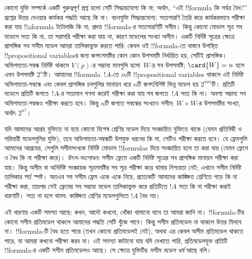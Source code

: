 \documentclass[../../../include/open-logic-section]{subfiles}
\begin{document}


কোনো যুক্তি সম্পর্কে একটি গুরুত্বপূর্ণ প্রশ্ন হলো সেটি সিদ্ধান্তযোগ্য কি না; অর্থাৎ, “এই !!{formula} কি সর্বত্র বৈধ?” প্রশ্নের উত্তর দেওয়ার কার্যকর পদ্ধতি আছে কি না। বচনযুক্তি সিদ্ধান্তযোগ্য: সত্যসারণি তৈরি করে কার্যকরভাবে পরীক্ষা করা যায় !!a{formula} টটোলজি কি না; প্রদত্ত !!{formula}-র সত্যসারণিটি সসীম। কিন্তু কোনো মোডাল সূত্র সব মডেলে সত্য কি না, তা সরাসরি পরীক্ষা করা যায় না, কারণ মডেলের সংখ্যা অসীম। একটি নির্দিষ্ট সূত্রের ক্ষেত্রে প্রাসঙ্গিক সব সসীম মডেল আমরা তালিকাভুক্ত করতে পারি: কেবল ওই !!{formula}-তে বাস্তবে উপস্থিত !!{propositional variable}sর জন্য জগৎসমষ্টির কোন কোন উপসমষ্টি নির্ধারিত হয়, সেটিই প্রাসঙ্গিক। অভিগম্যতা-সম্বন্ধ নির্দিষ্ট থাকলে $V(p)$-র সম্ভাব্য মানগুলি হলো~$W$-র সব উপসমষ্টি; $\card{W} = n$ হলে এমন উপসমষ্টি $2^n$টি। আমাদের !!{formula}~$!A$-তে $m$টি !!{propositional
  variable}s থাকলে এই নির্দিষ্ট অভিগম্যতা-সম্বন্ধে এবং কেবল প্রাসঙ্গিক চলগুলির মানায়ন ধরে $n$টি জগৎবিশিষ্ট ভিন্ন মডেল হয় $2^{nm}$টি। প্রতিটি মডেলে প্রতিটি জগতে~$!A$-র সত্যমান গণনা করেই পরীক্ষা করা যায় সব জগতে~$!A$ সত্য কি না। অবশ্য সম্ভাব্য সব অভিগম্যতা-সম্বন্ধও পরীক্ষা করতে হবে। কিন্তু $n$টি জগতে সম্বন্ধের সংখ্যাও সসীম: $W \times W$-র উপসমষ্টির সংখ্যা, অর্থাৎ $2^{n^2}$।

যদি আমাদের আগ্রহ  যুক্তিতে না হয়ে কোনো বিশেষ শ্রেণির মডেল দিয়ে সংজ্ঞায়িত যুক্তিতে থাকে (যেমন প্রতিবিম্বী ও পরিযায়ী মডেলগুলির যুক্তি), তবে অভিগম্যতা-সম্বন্ধটি উপযুক্ত ধরনের কি না, সেটিও পরীক্ষা করতে হবে। যে ফ্রেমগুলি আমাদের আগ্রহের, সেগুলি সসীমসংখ্যক নির্দিষ্ট মোডাল !!{formula}s দিয়ে সংজ্ঞায়িত হলে তা করা যায় (যেমন ফ্রেমে  ও  বৈধ কি না পরীক্ষা করে)।
\emph{উৎস-সংশোধন:} সসীম ফ্রেমে একটি নির্দিষ্ট সূত্রের সব প্রাসঙ্গিক মানায়ন পরীক্ষা করা যায়। কিন্তু অসীম বা অনির্দিষ্ট সংজ্ঞায়ক সূত্রসমষ্টির সব সূত্র পরীক্ষা করে থামার নিশ্চয়তা নেই; এখানে সসীম নির্দিষ্ট তালিকার শর্ত স্পষ্ট।
অতএব সব সসীম ফ্রেম একে একে নিয়ে, প্রত্যেকটি আমাদের কাঙ্ক্ষিত শ্রেণিতে পড়ে কি না পরীক্ষা করা, তারপর সেই ফ্রেমের সব সম্ভাব্য মডেল তালিকাভুক্ত করে প্রতিটিতে $!A$ সত্য কি না পরীক্ষা করাই ধারণাটি। সত্য না হলে থামব: কাঙ্ক্ষিত শ্রেণির মডেলগুলিতে $!A$ বৈধ নয়।

এই ধারণায় একটি সমস্যা আছে: কখন, আদৌ কখনো, খোঁজা থামানো যাবে তা আমরা জানি না। !!{formula}-টির কোনো সসীম প্রতিমডেল থাকলে আমাদের পদ্ধতি সেটি খুঁজে পাবে। কিন্তু সসীম প্রতিমডেল না থাকলে উত্তর মিলবে না। !!{formula}-টি বৈধ হতে পারে (তখন কোনো প্রতিমডেলই নেই), অথবা এর কেবল অসীম প্রতিমডেল থাকতে পারে, যা আমরা কখনো পরীক্ষা করব না। এই সমস্যা কাটানো যায় যদি দেখাতে পারি, প্রতিমডেলযুক্ত প্রতিটি !!{formula}-র একটি সসীম প্রতিমডেলও আছে। সে ক্ষেত্রে যুক্তিটির \emph{সসীম মডেল ধর্ম} আছে বলি।
\end{document}
